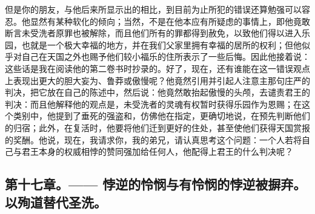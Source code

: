 但是你的朋友，与他后来所显示出的相比，到目前为止所犯的错误还算勉强可以容忍。他显然有某种软化的倾向；当然，不是在他本应有所疑虑的事情上，即他竟敢断言未受洗者原罪也被解除，而且他们所有的罪都得到赦免，以致他们得以进入乐园，也就是一个极大幸福的地方，并在我们父家里拥有幸福的居所的权利；但他似乎对自己在天国之外也赐予他们较小福乐的住所表示了一些后悔。因此他接着说：这些话是我在阅读他的第二卷书时抄录的。好了，现在，还有谁能在这一错误观点上表现出更大的胆大妄为、鲁莽或傲慢呢？他竟然引用并引起人注意主那句庄严的判决，把它放在自己的陈述中，然后说：他竟然敢抬起傲慢的头颅，去谴责君王的判决：而且他解释他的观点是，未受洗者的灵魂有权暂时获得乐园作为恩赐；在这个类别中，他提到了垂死的强盗和，仿佛他在指定，更确切地说，在预先判断他们的归宿；此外，在复活时，他要将他们迁到更好的住处，甚至使他们获得天国赏报的奖酬。他说，现在，我请求你，我的弟兄，请认真思考这个问题：一个人若将自己与君王本身的权威相悖的赞同强加给任何人，他配得上君王的什么判决呢？\par


\subsection{第十七章。—— 悖逆的怜悯与有怜悯的悖逆被摒弃。以殉道替代圣洗。}

